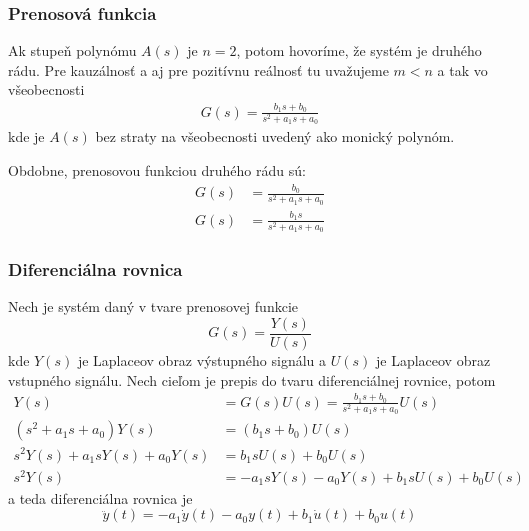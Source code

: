 \documentclass[a4paper, 10pt, ]{article}
\begin{document}
\subsubsection{Prenosová funkcia}

Ak stupeň polynómu $A(s)$ je $n = 2$, potom hovoríme, že systém je druhého rádu. Pre kauzálnosť a aj pre pozitívnu reálnosť tu uvažujeme $m<n$ a tak vo všeobecnosti
\begin{align} \label{typ2radtf}
    G(s) = \frac{b_1 s + b_0}{s^2 + a_1 s + a_0}
\end{align}
kde je $A(s)$ bez straty na všeobecnosti uvedený ako monický polynóm.

Obdobne, prenosovou funkciou druhého rádu sú:
\begin{subequations}
    \begin{align}
        G(s) &= \frac{b_0}{s^2 + a_1 s + a_0} \\
        G(s) &= \frac{b_1 s}{s^2 + a_1 s + a_0}
    \end{align}
\end{subequations}



\subsubsection{Diferenciálna rovnica}

Nech je systém daný v tvare prenosovej funkcie
\begin{equation}
    G(s) = \frac{Y(s)}{U(s)}
\end{equation}
kde $Y(s)$ je Laplaceov obraz výstupného signálu a $U(s)$ je Laplaceov obraz vstupného signálu. Nech cieľom je prepis do tvaru diferenciálnej rovnice, potom
\begin{subequations}
    \begin{align}
        Y(s) &= G(s) U(s) = \frac{b_1 s + b_0}{s^2 + a_1 s + a_0} U(s) \\
        (s^2 + a_1 s + a_0) Y(s) &= (b_1 s + b_0) U(s) \\
        s^2 Y(s) + a_1 s Y(s) + a_0 Y(s) &= b_1 s U(s) + b_0 U(s) \\
        s^2 Y(s) &= - a_1 s Y(s) - a_0 Y(s) + b_1 s U(s) + b_0 U(s) 
    \end{align}
\end{subequations}
a teda diferenciálna rovnica je
\begin{equation} \label{difrovnica2rad}
    \ddot y(t)  =  - a_1 \dot y(t) - a_0 y(t) + b_1 \dot u(t) + b_0 u(t)
\end{equation}
\end{document}
